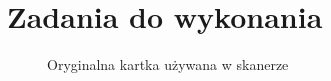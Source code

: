 \documentclass[a4paper,12pt]{extarticle}  %
\begin{document}
\section{Zadania do wykonania}
\begin{figure}[H]
	\centering
	\caption{Oryginalna kartka używana w skanerze}
\end{figure}
\end{document}

